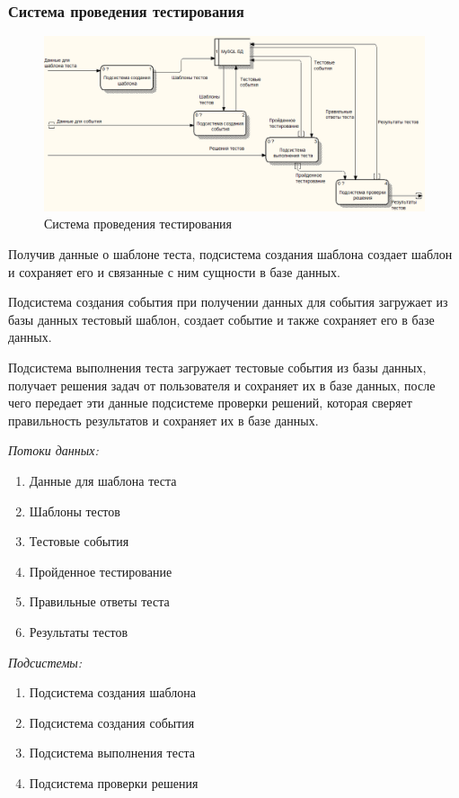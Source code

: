 \subsubsection{Система проведения тестирования}
\begin{figure}[H]
    \includegraphics[width=\textwidth, center]{../img/dfd/ContextDecompose.png}
    \caption{Система проведения тестирования}
\end{figure}

Получив данные о шаблоне теста, подсистема создания шаблона создает шаблон и сохраняет
его и связанные с ним сущности в базе данных.

Подсистема создания события при
получении данных для события загружает из базы данных тестовый шаблон, создает событие
и также сохраняет его в базе данных.

Подсистема выполнения теста загружает тестовые события из базы данных, получает решения
задач от пользователя и сохраняет их в базе данных, после чего передает эти данные
подсистеме проверки решений, которая сверяет правильность результатов и сохраняет их в базе
данных.

\textit{Потоки данных:}
\begin{enumerate}
    \item Данные для шаблона теста
    \item Шаблоны тестов
    \item Тестовые события
    \item Пройденное тестирование
    \item Правильные ответы теста
    \item Результаты тестов
\end{enumerate}

\textit{Подсистемы:}
\begin{enumerate}
    \item Подсистема создания шаблона
    \item Подсистема создания события
    \item Подсистема выполнения теста
    \item Подсистема проверки решения
\end{enumerate}

